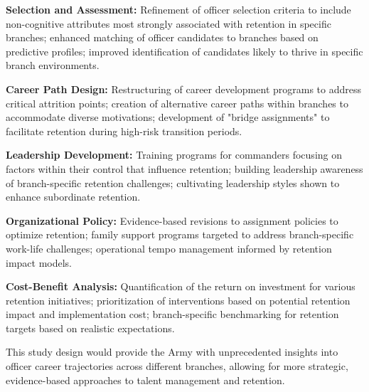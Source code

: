 \documentclass[../main.tex]{subfiles}
\begin{document}
\textbf{Selection and Assessment:} Refinement of officer selection criteria to include non-cognitive attributes most strongly associated with retention in specific branches; enhanced matching of officer candidates to branches based on predictive profiles; improved identification of candidates likely to thrive in specific branch environments.

\textbf{Career Path Design:} Restructuring of career development programs to address critical attrition points; creation of alternative career paths within branches to accommodate diverse motivations; development of "bridge assignments" to facilitate retention during high-risk transition periods.

\textbf{Leadership Development:} Training programs for commanders focusing on factors within their control that influence retention; building leadership awareness of branch-specific retention challenges; cultivating leadership styles shown to enhance subordinate retention.

\textbf{Organizational Policy:} Evidence-based revisions to assignment policies to optimize retention; family support programs targeted to address branch-specific work-life challenges; operational tempo management informed by retention impact models.

\textbf{Cost-Benefit Analysis:} Quantification of the return on investment for various retention initiatives; prioritization of interventions based on potential retention impact and implementation cost; branch-specific benchmarking for retention targets based on realistic expectations.

This study design would provide the Army with unprecedented insights into officer career trajectories across different branches, allowing for more strategic, evidence-based approaches to talent management and retention.



\end{document}
